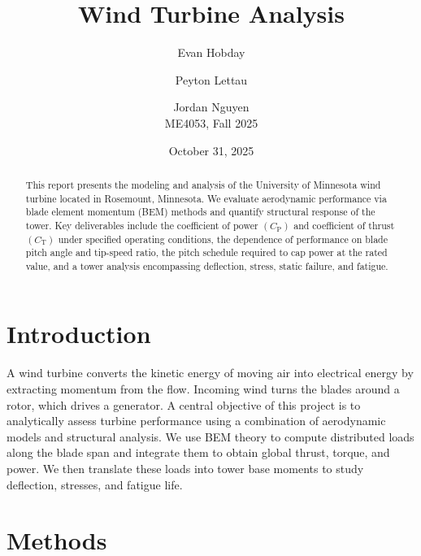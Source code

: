 \documentclass[11pt]{article}
\title{Wind Turbine Analysis}
\author{Evan Hobday \and Peyton Lettau \and Jordan Nguyen \\ ME4053, Fall 2025}
\date{October 31, 2025}
\begin{document}
\maketitle

\begin{abstract}
This report presents the modeling and analysis of the University of Minnesota wind turbine located in Rosemount, Minnesota. We evaluate aerodynamic performance via blade element momentum (BEM) methods and quantify structural response of the tower. Key deliverables include the coefficient of power \((C_\mathrm{P})\) and coefficient of thrust \((C_\mathrm{T})\) under specified operating conditions, the dependence of performance on blade pitch angle and tip-speed ratio, the pitch schedule required to cap power at the rated value, and a tower analysis encompassing deflection, stress, static failure, and fatigue.
\end{abstract}

\section{Introduction}
A wind turbine converts the kinetic energy of moving air into electrical energy by extracting momentum from the flow. Incoming wind turns the blades around a rotor, which drives a generator. A central objective of this project is to analytically assess turbine performance using a combination of aerodynamic models and structural analysis. We use BEM theory to compute distributed loads along the blade span and integrate them to obtain global thrust, torque, and power. We then translate these loads into tower base moments to study deflection, stresses, and fatigue life.

\section{Methods}
\end{document}
